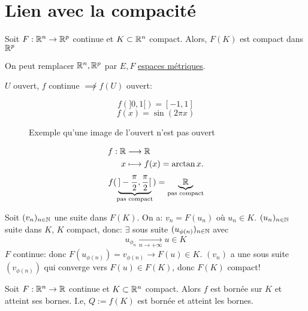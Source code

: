\section{Lien avec la compacité}
\begin{theorem}
    Soit $F: \mathbb{R}^n \to \mathbb{R}^p$ continue et $K \subset \mathbb{R}^n$ compact. Alors, $F(K)$ est compact dans  $\mathbb{R}^p$
\end{theorem}
\begin{remark}
    On peut remplacer $\mathbb{R}^n, \mathbb{R}^p$ par $E, F$ \underline{espaces métriques}.
\end{remark}
\begin{remark}
   $U$ ouvert,  $f$ continue $\not\implies f(U)$ ouvert:
\end{remark}
\begin{eg}
   \[
       f(]0, 1[) = [-1, 1]
   \]  
   \[
   f(x) = \sin(2\pi x)
   \] 
\begin{figure}[H]
    \centering
    \caption{Exemple qu'une image de l'ouvert n'est pas ouvert}
    \label{fig:exemple-ouvert-nimplique-pas-image-ouvert}
\end{figure}
\end{eg}
\begin{eg}
   \begin{align*}
       f: \mathbb{R} &\longrightarrow \mathbb{R} \\
       x &\longmapsto f(x) = \arctan x
   .\end{align*} 
   \[
       f(\underbrace{]-\frac{\pi}{2}, \frac{\pi}{2}[}_{\text{pas compact}}) = \underbrace{\mathbb{R}}_{\text{pas compact}}
   \] 
\end{eg}
\begin{preuve}
    Soit $(v_n)_{n \in \mathbb{N}}$ une suite dans $F(K)$. On a:  $v_n = F(u_n)$ où  $u_n \in K$.  $(u_n)_{n \in \mathbb{N}}$ suite dans $K$,  $K$ compact, donc:  $\exists$ sous suite $(u_{\phi(n)})_{n \in \mathbb{N}}$ avec 
    \[
        u_{\phi_n} \xrightarrow[n \to +\infty]{} u \in K
    \] 
    $F$ continue: donc  $F(u_{\phi(n)}) = v_{\phi(n)} \to F(u) \in K$. $(v_n)$ a une sous suite  $(v_{\phi(n)})$ qui converge vers $F(u) \in F(K)$, donc $F(K)$ compact!
\end{preuve}
\begin{theorem}
    Soit $F: \mathbb{R}^n \to \mathbb{R}$ continue et $K \subset \mathbb{R}^n$ compact. Alors $f$ est bornée sur  $K$ et atteint ses bornes. I.e, $Q := f(K)$ est bornée et atteint les bornes.
\end{theorem}
